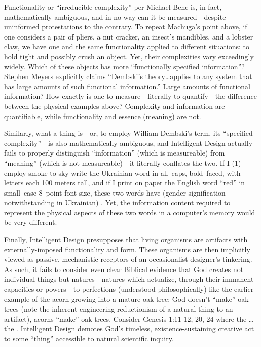 Functionality or ``irreducible complexity'' per Michael Behe is, in fact, mathematically ambiguous, and in no way can it be measured---despite uninformed protestations to the contrary. To repeat Machuga's point above, if one considers a pair of pliers, a nut cracker, an insect's mandibles, and a lobster claw, we have one and the same functionality applied to different situations: to hold tight and possibly crush an object. Yet, their complexities vary exceedingly widely. Which of these objects has more ``functionally specified information''? Stephen Meyers explicitly claims ``Dembski's theory\ldots applies to any system that has large amounts of such functional information.''\cite[pg.~372]{sigcell} Large amounts of functional information? How exactly is one to measure---literally to quantify---the difference between the physical examples above? Complexity and information are quantifiable, while functionality and essence (meaning) are not.

Similarly, what a thing is---or, to employ William Dembski's term, its ``specified complexity''---is also mathematically ambiguous, and Intelligent Design actually fails to properly distinguish ``information'' (which is measureable) from ``meaning'' (which is not measureable)---it literally conflates the two. If I (1) employ smoke to sky-write the Ukrainian word  in all--caps, bold--faced, with letters each 100 meters tall, and if I print on paper the English word ``red'' in small--case 8--point font size, these two words have (gender signification notwithstanding in Ukrainian) . Yet, the information content required to represent the physical aspects of these two words in a computer's memory would be very different.

Finally, Intelligent Design presupposes that living organisms are artifacts with externally-imposed functionality and form. These organisms are then implicitly viewed as passive, mechanistic receptors of an occasionalist designer's tinkering. As such, it fails to consider even clear Biblical evidence that God creates not individual things but natures---natures which actualize, through their immanent capacities or powers---to perfections (understood philosophically) like the earlier example of the acorn growing into a mature oak tree: God doesn't ``make'' oak trees (note the inherent engineering reductionism of a natural thing to an artifact), acorns ``make'' oak trees. Consider Genesis 1:11-12, 20, 24 where the \ldots the . Intelligent Design demotes God's timeless, existence-sustaining creative act to some ``thing'' accessible to natural scientific inquiry.

